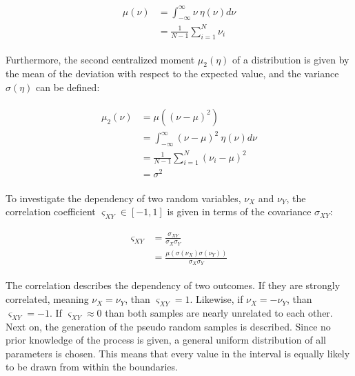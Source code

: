 \begin{align}
\begin{split}
\mu\left(\nu\right) &= \int_{-\infty}^{\infty} \nu~\eta\left(\nu \right) d\nu \\
&= \frac{1}{N-1}\sum_{i = 1}^{N}  \nu_i
\end{split}
\label{c:montecarlo:e:mean}
\end{align}

Furthermore, the second centralized moment $\mu_2\left( \eta\right)$ of a distribution is given by the mean of the deviation with respect to the expected value, and the variance $\sigma\left(\eta\right)$ can be defined:

\begin{align}
\begin{split}
\mu_2\left(\nu\right) &= \mu\left( \left(\nu - \mu\right)^2 \right) \\
&=  \int_{-\infty}^{\infty} \left(\nu - \mu \right)^2 ~\eta\left(\nu \right) d\nu \\
&= \frac{1}{N-1}\sum_{i=1}^N \left(\nu_i - \mu\right)^2 \\
&= \sigma^2
\end{split}
\label{c:montecarlo:e:variance}
\end{align}

To investigate the dependency of two random variables, $\nu_X$ and $\nu_Y$, the correlation coefficient $\varsigma_{XY} \in \left[-1,1 \right]$ is given in terms of the covariance $\sigma_{XY}$:

\begin{align}
\begin{split}
\varsigma_{XY} &= \frac{\sigma_{XY}}{\sigma_X \sigma_Y} \\
&= \frac{\mu\left(\sigma\left(\nu_X\right) \sigma\left(\nu_Y\right) \right)}{\sigma_X \sigma_Y}
\end{split}
\label{c:montecarlo:e:correlation}
\end{align}

The correlation describes the dependency of two outcomes. If they are strongly correlated, meaning $\nu_X = \nu_Y$, than $\varsigma_{XY} = 1$. Likewise, if $\nu_X = -\nu_Y$, than $\varsigma_{XY} = -1$. If $\varsigma_{XY} \approx 0$ than both samples are nearly unrelated to each other.\\

Next on, the generation of the pseudo random samples is described. 
Since no prior knowledge of the process is given, a general uniform distribution of all parameters is chosen. This means that every value in the interval is equally likely to be drawn from within the boundaries. \\

